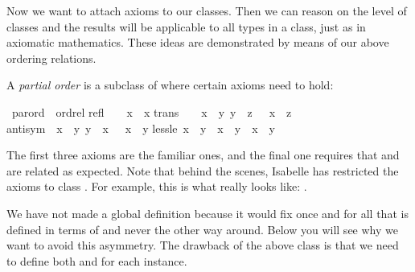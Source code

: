 %
\begin{isabellebody}%
\def\isabellecontext{Axioms}%
%
%
\begin{isamarkuptext}%
Now we want to attach axioms to our classes. Then we can reason on the
level of classes and the results will be applicable to all types in a class,
just as in axiomatic mathematics. These ideas are demonstrated by means of
our above ordering relations.%
\end{isamarkuptext}%
%
%
\begin{isamarkuptext}%
A \emph{partial order} is a subclass of 
where certain axioms need to hold:%
\end{isamarkuptext}%
\ parord\ {\isacharless}\ ordrel\isanewline
refl{\isacharcolon}\ \ \ \ {\isachardoublequote}x\ {\isacharless}{\isacharless}{\isacharequal}\ x{\isachardoublequote}\isanewline
trans{\isacharcolon}\ \ \ {\isachardoublequote}{\isasymlbrakk}\ x\ {\isacharless}{\isacharless}{\isacharequal}\ y{\isacharsemicolon}\ y\ {\isacharless}{\isacharless}{\isacharequal}\ z\ {\isasymrbrakk}\ {\isasymLongrightarrow}\ x\ {\isacharless}{\isacharless}{\isacharequal}\ z{\isachardoublequote}\isanewline
antisym{\isacharcolon}\ {\isachardoublequote}{\isasymlbrakk}\ x\ {\isacharless}{\isacharless}{\isacharequal}\ y{\isacharsemicolon}\ y\ {\isacharless}{\isacharless}{\isacharequal}\ x\ {\isasymrbrakk}\ {\isasymLongrightarrow}\ x\ {\isacharequal}\ y{\isachardoublequote}\isanewline
less{\isacharunderscore}le{\isacharcolon}\ {\isachardoublequote}x\ {\isacharless}{\isacharless}\ y\ {\isacharequal}\ {\isacharparenleft}x\ {\isacharless}{\isacharless}{\isacharequal}\ y\ {\isasymand}\ x\ {\isasymnoteq}\ y{\isacharparenright}{\isachardoublequote}%
\begin{isamarkuptext}%
\noindent
The first three axioms are the familiar ones, and the final one
requires that \isa{{\isacharless}{\isacharless}} and \isa{{\isacharless}{\isacharless}{\isacharequal}} are related as expected.
Note that behind the scenes, Isabelle has restricted the axioms to class
. For example, this is what  really looks like:
.

We have not made  a global definition because it would
fix once and for all that \isa{{\isacharless}{\isacharless}} is defined in terms of \isa{{\isacharless}{\isacharless}{\isacharequal}} and
never the other way around. Below you will see why we want to avoid this
asymmetry. The drawback of the above class is that
we need to define both \isa{{\isacharless}{\isacharless}{\isacharequal}} and \isa{{\isacharless}{\isacharless}} for each instance.


\end{isamarkuptext}
\end{isabellebody}
